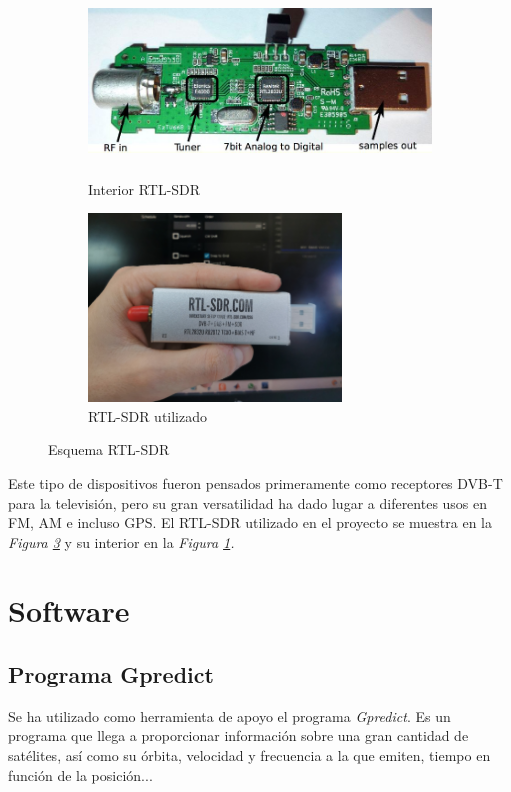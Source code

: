 \documentclass[a4paper,openright,12pt]{article}
\begin{document}
	 \begin{figure}[!tbp]
  \begin{subfigure}[b]{0.49\textwidth}
    \includegraphics[width=\textwidth, height=5cm]{imagenes/inner_RTL.JPG}
    \caption{Interior RTL-SDR}
    \label{inner_RTL}
  \end{subfigure}
  \hfill
  \begin{subfigure}[b]{0.49\textwidth}
    \includegraphics[width=\textwidth, height=5cm]{imagenes/rtl.JPG}
    \caption{RTL-SDR utilizado}
    \label{rtl}
  \end{subfigure}
  \caption{Esquema RTL-SDR}
\end{figure}

Este tipo de dispositivos fueron pensados primeramente como receptores DVB-T para la televisión, pero su gran versatilidad ha dado lugar a diferentes usos en FM, AM e incluso GPS.
El RTL-SDR utilizado en el proyecto se muestra en la \textit{Figura \ref{rtl}} y su interior en la \textit{Figura \ref{inner_RTL}.} 
\newpage
\section{Software}

	\subsection{Programa Gpredict}
	Se ha utilizado como herramienta de apoyo el programa \textit{Gpredict}. Es un programa que llega a proporcionar información sobre una gran cantidad de satélites, así como su órbita, velocidad y frecuencia a la que emiten, tiempo en función de la posición...
	
\end{document}
